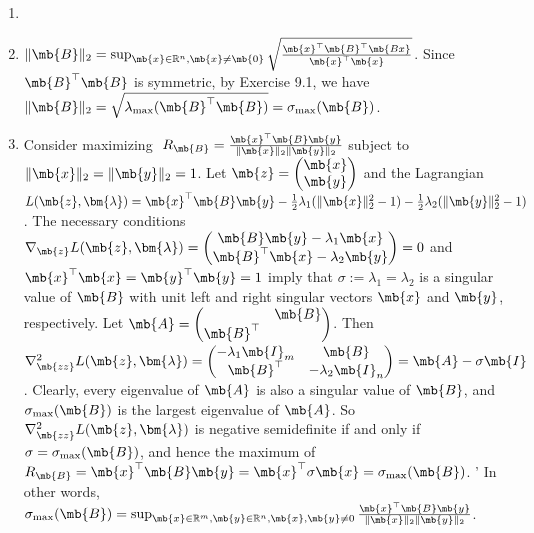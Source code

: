 \begin{exercise}
\begin{enumerate}
			\begin{solution}
				\begin{enumerate}
					\item []
					\item $\|\mb{B}\|_2=\sup_{\mb{x}\in\mathbb{R}^n, \mb{x}\not=\mb{0}}\sqrt{\frac{\mb{x}^\top\mb{B}^\top\mb{Bx}}{\mb{x}^\top\mb{x}}}$. Since $\mb{B}^\top\mb{B}$ is symmetric, by Exercise 9.1, we have $\|\mb{B}\|_2=\sqrt{\lambda_{\max}(\mb{B}^\top\mb{B})}=\sigma_{\max}(\mb{B})$.
					\item
						Consider maximizing $\ R_\mb{B} = \frac{\mb{x}^\top\mb{B}\mb{y}}{\|\mb{x}\|_2 \|\mb{y}\|_2}$ subject to $\|\mb{x}\|_2 = \|\mb{y}\|_2 = 1$.
						Let $\mb{z} = \begin{pmatrix}
								\mb{x} \\
								\mb{y}
							\end{pmatrix}$ and the Lagrangian $L(\mb{z},\bm{\lambda})=\mb{x}^\top\mb{B}\mb{y}-\frac{1}{2}\lambda_1(\|\mb{x}\|^2_2-1) - \frac{1}{2}\lambda_2(\|\mb{y}\|^2_2-1)$. The necessary conditions
						$\nabla_\mb{z} L(\mb{z},\bm{\lambda}) = \begin{pmatrix}
								\mb{B}\mb{y}-\lambda_1\mb{x} \\
								\mb{B}^\top\mb{x}-\lambda_2\mb{y}
							\end{pmatrix}=0$ and $\mb{x}^\top\mb{x}=\mb{y}^\top\mb{y}=1$ imply that $\sigma:=\lambda_1=\lambda_2$ is a singular value of $\mb{B}$ with unit left and right singular vectors $\mb{x}$ and $\mb{y}$, respectively.
						Let $\mb{A} = \begin{pmatrix}
								            & \mb{B} \\
								\mb{B}^\top &
							\end{pmatrix}$.
						Then $\nabla^2_\mb{zz} L(\mb{z},\bm{\lambda}) = \begin{pmatrix}
								-\lambda_1\mb{I}_m & \mb{B}             \\
								\mb{B}^\top        & -\lambda_2\mb{I}_n
							\end{pmatrix} = \mb{A} -\sigma\mb{I}$.
						Clearly, every eigenvalue of $\mb{A}$ is also a singular value of $\mb{B}$, and $\sigma_{\max}(\mb{B})$ is the largest eigenvalue of $\mb{A}$.
						So $\nabla^2_\mb{zz} L(\mb{z},\bm{\lambda})$ is negative semidefinite if and only if $\sigma = \sigma_{\max}(\mb{B})$, and hence the maximum of $R_\mb{B} = \mb{x}^\top\mb{B}\mb{y}=\mb{x}^\top\sigma\mb{x} = \sigma_{\max}(\mb{B})$. '
						In other words, $\sigma_{\max}(\mb{B}) = \sup_{\mb{x}\in\mathbb{R}^m, \mb{y}\in\mathbb{R}^n, \mb{x},\mb{y}\not=0}\frac{\mb{x}^\top \mb{B}\mb{y}}{\|\mb{x}\|_2\|\mb{y}\|_2}$.

\end{enumerate}
\end{solution}
\end{enumerate}
\end{exercise}
